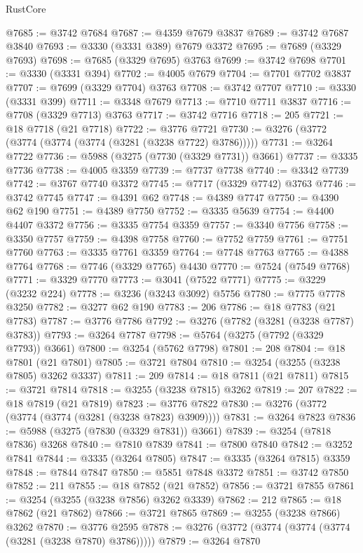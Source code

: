 \begin{lexlean}{RustCore}
\begin{coremodule}
@7685 := @3742 @7684
@7687 := @4359 @7679 @3837
@7689 := @3742 @7687 @3840
@7693 := @3330 (@3331 @389) @7679 @3372
@7695 := @7689 (@3329 @7693)
@7698 := @7685 (@3329 @7695) @3763
@7699 := @3742 @7698
@7701 := @3330 (@3331 @394)
@7702 := @4005 @7679
@7704 := @7701 @7702 @3837
@7707 := @7699 (@3329 @7704) @3763
@7708 := @3742 @7707
@7710 := @3330 (@3331 @399)
@7711 := @3348 @7679
@7713 := @7710 @7711 @3837
@7716 := @7708 (@3329 @7713) @3763
@7717 := @3742 @7716
@7718 := 205
@7721 := @18 @7718 (@21 @7718)
@7722 := @3776 @7721
@7730 := @3276 (@3772 (@3774 (@3774 (@3774 (@3281 (@3238 @7722) @3786)))))
@7731 := @3264 @7722
@7736 := @5988 (@3275 (@7730 (@3329 @7731)) @3661)
@7737 := @3335 @7736
@7738 := @4005 @3359
@7739 := @7737 @7738
@7740 := @3342 @7739
@7742 := @3767 @7740 @3372
@7745 := @7717 (@3329 @7742) @3763
@7746 := @3742 @7745
@7747 := @4391 @62
@7748 := @4389 @7747
@7750 := @4390 @62 @190
@7751 := @4389 @7750
@7752 := @3335 @5639
@7754 := @4400 @4407 @3372
@7756 := @3335 @7754 @3359
@7757 := @3340 @7756
@7758 := @3350 @7757
@7759 := @4398 @7758
@7760 := @7752 @7759
@7761 := @7751 @7760
@7763 := @3335 @7761 @3359
@7764 := @7748 @7763
@7765 := @4388 @7764
@7768 := @7746 (@3329 @7765) @4430
@7770 := @7524 (@7549 @7768)
@7771 := @3329 @7770
@7773 := @3041 (@7522 @7771)
@7775 := @3229 (@3232 @224)
@7778 := @3236 (@3243 @3092) @5756
@7780 := @7775 @7778 @3250
@7782 := @3277 @62 @190
@7783 := 206
@7786 := @18 @7783 (@21 @7783)
@7787 := @3776 @7786
@7792 := @3276 (@7782 (@3281 (@3238 @7787) @3783))
@7793 := @3264 @7787
@7798 := @5764 (@3275 (@7792 (@3329 @7793)) @3661)
@7800 := @3254 (@5762 @7798)
@7801 := 208
@7804 := @18 @7801 (@21 @7801)
@7805 := @3721 @7804
@7810 := @3254 (@3255 (@3238 @7805) @3262 @3337)
@7811 := 209
@7814 := @18 @7811 (@21 @7811)
@7815 := @3721 @7814
@7818 := @3255 (@3238 @7815) @3262
@7819 := 207
@7822 := @18 @7819 (@21 @7819)
@7823 := @3776 @7822
@7830 := @3276 (@3772 (@3774 (@3774 (@3281 (@3238 @7823) @3909))))
@7831 := @3264 @7823
@7836 := @5988 (@3275 (@7830 (@3329 @7831)) @3661)
@7839 := @3254 (@7818 @7836) @3268
@7840 := @7810 @7839
@7841 := @7800 @7840
@7842 := @3252 @7841
@7844 := @3335 (@3264 @7805)
@7847 := @3335 (@3264 @7815) @3359
@7848 := @7844 @7847
@7850 := @5851 @7848 @3372
@7851 := @3742 @7850
@7852 := 211
@7855 := @18 @7852 (@21 @7852)
@7856 := @3721 @7855
@7861 := @3254 (@3255 (@3238 @7856) @3262 @3339)
@7862 := 212
@7865 := @18 @7862 (@21 @7862)
@7866 := @3721 @7865
@7869 := @3255 (@3238 @7866) @3262
@7870 := @3776 @2595
@7878 := @3276 (@3772 (@3774 (@3774 (@3774 (@3281 (@3238 @7870) @3786)))))
@7879 := @3264 @7870

\end{coremodule}
\end{lexlean}
